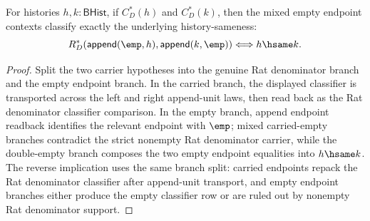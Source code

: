 \begin{theorem}
\label{thm:field-rat-denominator-unit-envelope-empty-context-hsame-iff}
For histories $h,k:\mathsf{BHist}$, if $C_D^\ast(h)$ and $C_D^\ast(k)$,
then the mixed empty endpoint contexts classify exactly the underlying
history-sameness:
$$
R_D^\ast(\mathsf{append}(\emp,h),\mathsf{append}(k,\emp))
\Longleftrightarrow h\hsame k.
$$
\end{theorem}
\begin{proof}
Split the two carrier hypotheses into the genuine Rat denominator branch and
the empty endpoint branch. In the carried branch, the displayed classifier is
transported across the left and right append-unit laws, then read back as the
Rat denominator classifier comparison. In the empty branch, append endpoint
readback identifies the relevant endpoint with $\emp$; mixed carried-empty
branches contradict the strict nonempty Rat denominator carrier, while the
double-empty branch composes the two empty endpoint equalities into
$h\hsame k$. The reverse implication uses the same branch split: carried
endpoints repack the Rat denominator classifier after append-unit transport,
and empty endpoint branches either produce the empty classifier row or are
ruled out by nonempty Rat denominator support.
\end{proof}

